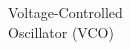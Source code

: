 \documentclass[preview]{standalone}
\begin{document}
\begin{center}
Voltage-Controlled\\Oscillator (VCO)
\end{center}
\end{document}

